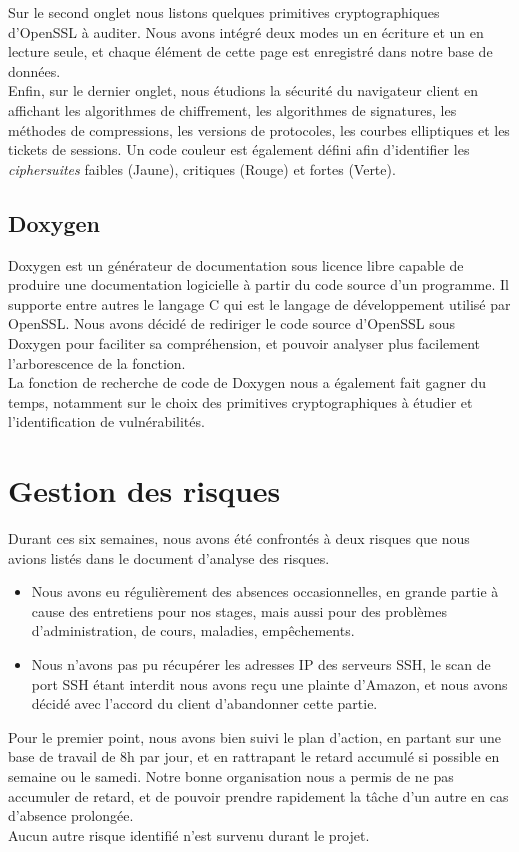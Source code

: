Sur le second onglet nous listons quelques primitives cryptographiques d'OpenSSL à auditer. Nous avons intégré deux modes un en écriture et un en lecture seule, et chaque élément de cette page est enregistré dans notre base de données.\\

Enfin, sur le dernier onglet, nous étudions la sécurité du navigateur client en affichant les algorithmes de chiffrement, les algorithmes de signatures, les méthodes de compressions, les versions de protocoles, les courbes elliptiques et les tickets de sessions. Un code couleur est également défini afin d'identifier les \textit{ciphersuites} faibles (Jaune), critiques (Rouge) et fortes (Verte).

\subsection{Doxygen}

Doxygen est un générateur de documentation sous licence libre capable de produire une documentation logicielle à partir du code source d'un programme. Il supporte entre autres le langage C qui est le langage de développement utilisé par OpenSSL. Nous avons décidé de rediriger le code source d'OpenSSL sous Doxygen pour faciliter sa compréhension, et pouvoir analyser plus facilement l'arborescence de la fonction.\\
La fonction de recherche de code de Doxygen nous a également fait gagner du temps, notamment sur le choix des primitives cryptographiques à étudier et l'identification de vulnérabilités.\\

\section{Gestion des risques}

Durant ces six semaines, nous avons été confrontés à deux risques que nous avions listés dans le document d'analyse des risques.
\begin{itemize}
\item Nous avons eu régulièrement des absences occasionnelles, en grande partie à cause des entretiens pour nos stages, mais aussi pour des problèmes d'administration, de cours, maladies, empêchements.
\item Nous n'avons pas pu récupérer les adresses IP des serveurs SSH, le scan de port SSH étant interdit nous avons reçu une plainte d'Amazon, et nous avons décidé avec l'accord du client d'abandonner cette partie.\\
\end{itemize}

Pour le premier point, nous avons bien suivi le plan d'action, en partant sur une base de travail de 8h par jour, et en rattrapant le retard accumulé si possible en semaine ou le samedi. Notre bonne organisation nous a permis de ne pas accumuler de retard, et de pouvoir prendre rapidement la tâche d'un autre en cas d'absence prolongée.\\

Aucun autre risque identifié n'est survenu durant le projet.
